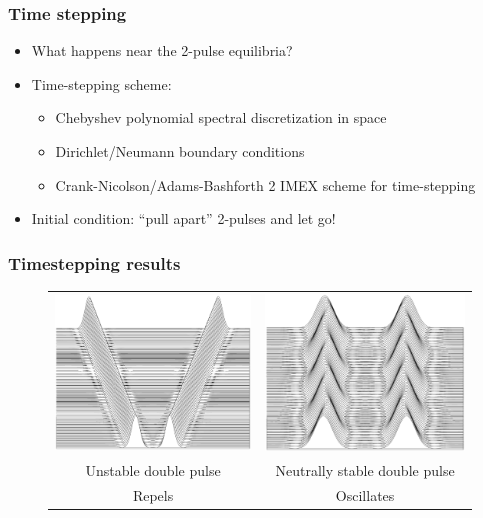 \documentclass[16pt]{beamer}
\begin{document}
\begin{frame}
	\frametitle{Time stepping}
	\fontsize{14}{7.2}\selectfont
	\begin{itemize}
		\item What happens near the 2-pulse equilibria?
		\vspace{0.5cm}
		\item Time-stepping scheme:
		\begin{itemize}
			\item Chebyshev polynomial spectral discretization in space
			\item Dirichlet/Neumann boundary conditions
			\item Crank-Nicolson/Adams-Bashforth 2 IMEX scheme for time-stepping
		\end{itemize}
		\vspace{0.5cm}
		\item Initial condition: ``pull apart'' 2-pulses and let go!
	\end{itemize}
\end{frame}

\begin{frame}
	\frametitle{Timestepping results}
	\fontsize{14}{7.2}\selectfont
	\begin{figure}[H]
	\begin{center}
	\begin{tabular}{cc}
	\includegraphics[width=0.4\linewidth]{images/waterfallunstable.eps} &
	\includegraphics[width=0.4\linewidth]{images/waterfallstable.eps} \\
	Unstable double pulse & Neutrally stable double pulse \\
	Repels & Oscillates
	\end{tabular}
	\end{center}
	\end{figure}
\end{frame}
 
\end{document}
